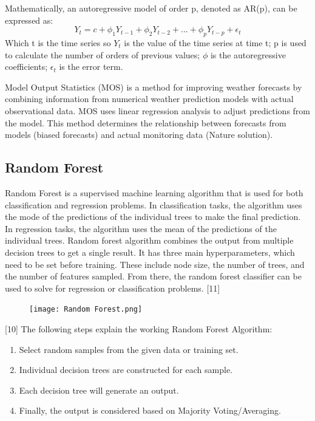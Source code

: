 \documentclass{ieeeojies}
\begin{document}
Mathematically, an autoregressive model of order p, denoted as AR(p), can be expressed as:
\[ Y_t = c + \phi_1 Y_{t-1} + \phi_2 Y_{t-2} +...+ \phi_p Y_{t-p} + \epsilon_t\]
Which t is the time series so \(Y_t\) is the value of the time series at time t; p is used to calculate the number of orders of previous values; \(\phi\) is the autoregressive coefficients; \(\epsilon_t\) is the error term.

Model Output Statistics (MOS) is a method for improving weather forecasts by combining information from numerical weather prediction models with actual observational data. MOS uses linear regression analysis to adjust predictions from the model. This method determines the relationship between forecasts from models (biased forecasts) and actual monitoring data (Nature solution).


\subsection{Random Forest}
Random Forest is a supervised machine learning algorithm that is used for both classification and regression problems. In classification tasks, the algorithm uses the mode of the predictions of the individual trees to make the final prediction. In regression tasks, the algorithm uses the mean of the predictions of the individual trees. 
Random forest algorithm combines the output from multiple decision trees to get a single result. It has three main hyperparameters, which need to be set before training. These include node size, the number of trees, and the number of features sampled. From there, the random forest classifier can be used to solve for regression or classification problems. [11] 


\begin{figure}[H]
    \centering
    \begin{minipage}{0.5\textwidth}
        \centering
        \texttt{[image: Random Forest.png]}
    \end{minipage}
\end{figure}

[10] The following steps explain the working Random Forest Algorithm:
\begin{enumerate}
  \item Select random samples from the given data or training set.
  \item Individual decision trees are constructed for each sample.
  \item Each decision tree will generate an output.
  \item Finally, the output is considered based on Majority Voting/Averaging.
\end{enumerate}
\end{document}
